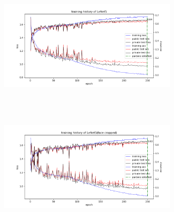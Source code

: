 \documentclass[journal, onecolumn]{IEEEtran}
\begin{document}
\begin{figure}[htb]
\centering
\begin{minipage}[t]{0.5\textwidth}
\includegraphics[width=3.5in, height=2.5in]{LeNet5.png}
\end{minipage}%
\begin{minipage}[t]{0.5\textwidth}
\includegraphics[width=3.5in, height=2.5in]{LeNet5_cv1.png}
\end{minipage}%


\end{figure}
\end{document}
